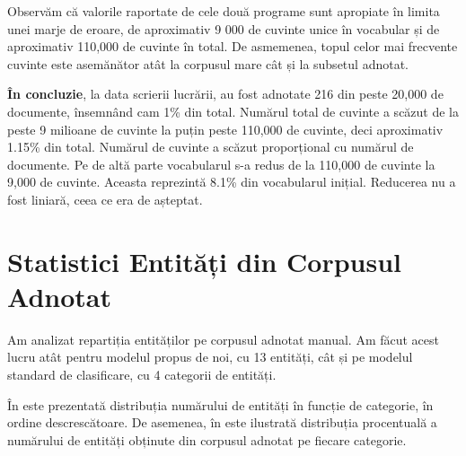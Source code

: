 \lstset{language=make}
\lstset{caption=Cele mai folosite cuvinte din limba engleză pentru subsetul adnotat din corpus obținut folosind Java, label=lst:top-words-java-annotated}


Observăm că valorile raportate de cele două programe sunt apropiate în limita unei marje de eroare, de aproximativ 9 000 de cuvinte unice în vocabular și de aproximativ 110,000 de cuvinte în total. De asmemenea, topul celor mai frecvente cuvinte este asemănător atât la corpusul mare cât și la subsetul adnotat.

\textbf{În concluzie}, la data scrierii lucrării, au fost adnotate 216 din peste 20,000 de documente, însemnând cam 1\% din total. Numărul total de cuvinte a scăzut de la peste 9 milioane de cuvinte la puțin peste 110,000 de cuvinte, deci aproximativ 1.15\% din total. Numărul de cuvinte a scăzut proporțional cu numărul de documente. Pe de altă parte vocabularul s-a redus de la 110,000 de cuvinte la 9,000 de cuvinte. Aceasta reprezintă 8.1\% din vocabularul inițial. Reducerea nu a fost liniară, ceea ce era de așteptat.

\section{Statistici Entități din Corpusul Adnotat}

Am analizat repartiția entităților pe corpusul adnotat manual. Am făcut acest lucru atât pentru modelul propus de noi, cu 13 entități, cât și pe modelul standard de clasificare, cu 4 categorii de entități.

În  este prezentată distribuția numărului de entități în funcție de categorie, în ordine descrescătoare. De asemenea, în  este ilustrată distribuția procentuală a numărului de entități obținute din corpusul adnotat pe fiecare categorie.

